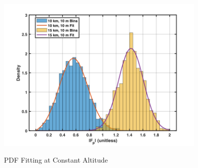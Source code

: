 \begin{figure}[H]
  \begin{center}
\includegraphics[width=4in]{../media/statistics/constant_altitude_fit.png}
  \end{center}
  \renewcommand{\baselinestretch}{1} \small\normalsize
  \begin{quote}
    \caption[PDF Fitting at Constant Altitude]{PDF Fitting at Constant Altitude\label{stat_fig:5}}
  \end{quote}
\end{figure}
\renewcommand{\baselinestretch}{2} \small\normalsize
